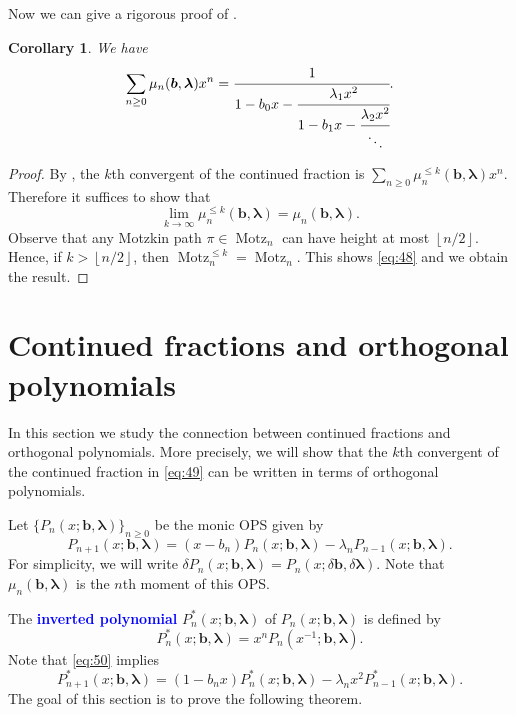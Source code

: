 \documentclass[oneside]{book}
\numberwithin{equation}{section}
\newtheorem{cor}[thm]{Corollary}
\theoremstyle{definition}
\newcommand\Motz{\operatorname{Motz}}
\renewcommand\vec[1]{\bm{#1}}
\newcommand\vb{\vec{b}}
\newcommand\vla{\vec{\lambda}}
\newcommand\flr[1]{\left\lfloor #1\right\rfloor}
\renewcommand\emph[1]{\textcolor{blue}{\bf #1}}
\begin{document}
Now we can give a rigorous proof of .

\begin{cor}\label{cor:6}
  We have
\begin{equation}\label{eq:49}
  \sum_{n\ge0} \mu_n(\vb,\vla)x^n = 
    \cfrac{1}{
    1-b_0x- \cfrac{\lambda_1x^2}{
      1-b_1x- \cfrac{\lambda_2x^2}{\ddots}}}.
\end{equation}
\end{cor}

\begin{proof}
  By , the \( k \)th convergent of the continued fraction is
  \( \sum_{n\ge0} \mu^{\le k}_n(\vb,\vla)x^n  \).
  Therefore it suffices to show that
  \begin{equation}\label{eq:48}
    \lim_{k\to \infty} \mu^{\le k}_n(\vb,\vla) = \mu_n(\vb,\vla).
  \end{equation}
  Observe that any Motzkin path \( \pi\in \Motz_n \) can have height
  at most \( \flr{n/2} \). Hence, if \( k> \flr{n/2} \), then
  \( \Motz^{\le k}_n = \Motz_n \). This shows \eqref{eq:48} and we
  obtain the result.
\end{proof}

\section{Continued fractions and orthogonal polynomials}

In this section we study the connection between continued fractions
and orthogonal polynomials. More precisely, we will show that the
\( k \)th convergent of the continued fraction in \eqref{eq:49} can be
written in terms of orthogonal polynomials.

Let \( \{P_n(x;\vb,\vla)\}_{n\ge0} \) be the monic OPS given by
\begin{equation}\label{eq:50}
  P_{n+1}(x;\vb,\vla) = (x-b_n) P_n(x;\vb,\vla) - \lambda_n P_{n-1}(x;\vb,\vla).
\end{equation}
For simplicity, we will write
\( \delta P_n(x;\vb,\vla) = P_n(x;\delta \vb,\delta \vla) \). Note
that \( \mu_n(\vb,\vla) \) is the \( n \)th moment of this OPS.

The \emph{inverted polynomial} \( P^*_n(x;\vb,\vla) \)
of \( P_n(x;\vb,\vla) \) is defined by
\[
  P^*_n(x;\vb,\vla) = x^n P_n(x^{-1};\vb,\vla).
\]
Note that \eqref{eq:50} implies
\begin{equation}\label{eq:51}
  P^*_{n+1}(x;\vb,\vla) = (1-b_nx) P^*_n(x;\vb,\vla) - \lambda_n x^2 P^*_{n-1}(x;\vb,\vla).
\end{equation}
The goal of this section is to prove the following theorem.
\end{document}
